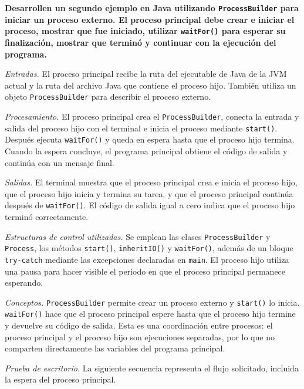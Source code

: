 \documentclass[12pt,oneside]{template/liverpoolthesis}
\begin{document}
\textbf{Desarrollen un segundo ejemplo en Java utilizando \texttt{ProcessBuilder}
para iniciar un proceso externo. El proceso principal debe crear e iniciar el
proceso, mostrar que fue iniciado, utilizar \texttt{waitFor()} para esperar su
finalización, mostrar que terminó y continuar con la ejecución del programa.}

\emph{Entradas.} El proceso principal recibe la ruta del ejecutable de Java de
la JVM actual y la ruta del archivo Java que contiene el proceso hijo. También
utiliza un objeto \texttt{ProcessBuilder} para describir el proceso externo.

\emph{Procesamiento.} El proceso principal crea el \texttt{ProcessBuilder},
conecta la entrada y salida del proceso hijo con el terminal e inicia el
proceso mediante \texttt{start()}. Después ejecuta \texttt{waitFor()} y queda
en espera hasta que el proceso hijo termina. Cuando la espera concluye, el
programa principal obtiene el código de salida y continúa con un mensaje final.

\emph{Salidas.} El terminal muestra que el proceso principal crea e inicia el
proceso hijo, que el proceso hijo inicia y termina su tarea, y que el proceso
principal continúa después de \texttt{waitFor()}. El código de salida igual a
cero indica que el proceso hijo terminó correctamente.

\emph{Estructuras de control utilizadas.} Se emplean las clases
\texttt{ProcessBuilder} y \texttt{Process}, los métodos \texttt{start()},
\texttt{inheritIO()} y \texttt{waitFor()}, además de un bloque
\texttt{try-catch} mediante las excepciones declaradas en \texttt{main}.
El proceso hijo utiliza una pausa para hacer visible el periodo en que el
proceso principal permanece esperando.

\emph{Conceptos.} \texttt{ProcessBuilder} permite crear un proceso externo y
\texttt{start()} lo inicia. \texttt{waitFor()} hace que el proceso principal
espere hasta que el proceso hijo termine y devuelve su código de salida. Esta
es una coordinación entre procesos: el proceso principal y el proceso hijo
son ejecuciones separadas, por lo que no comparten directamente las variables
del programa principal.

\emph{Prueba de escritorio.} La siguiente secuencia representa el flujo
solicitado, incluida la espera del proceso principal.
\end{document}

